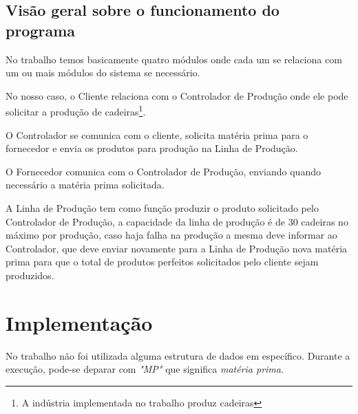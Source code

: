 \documentclass[brazil, a4paper,12pt]{article}
\begin{document}
\subsection{Vis\~ao geral sobre o funcionamento do programa}

No trabalho temos basicamente quatro módulos onde cada um se relaciona com um ou mais módulos do sistema se necessário.

No nosso caso, o Cliente relaciona com o Controlador de Produção onde ele pode solicitar a produção de cadeiras\footnote{A indústria implementada no trabalho produz cadeiras}.

O Controlador se comunica com o cliente, solicita matéria prima para o fornecedor e envia os produtos para produção na Linha de Produção. 

O Fornecedor comunica com o Controlador de Produção, enviando quando necessário a matéria prima solicitada.

A Linha de Produção tem como função produzir o produto solicitado pelo Controlador de Produção, a capacidade da linha de produção é de 30 cadeiras no máximo por produção, caso haja falha na produção a mesma deve informar ao Controlador, que deve enviar novamente para a Linha de Produção nova matéria prima para que o total de produtos perfeitos solicitados pelo cliente sejam produzidos.

\newpage

\section{Implementaç\~ao}

No trabalho não foi utilizada alguma estrutura de dados em específico. Durante a execução, pode-se deparar com \emph{"MP"} que significa \emph{matéria prima}.
\end{document}
